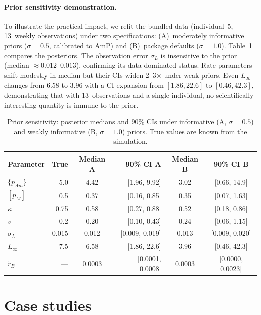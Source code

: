 \documentclass[article,shortnames]{jss}
\newcommand{\pAm}{\{p_{Am}\}}
\newcommand{\pM}{[p_M]}
\begin{document}
\paragraph{Prior sensitivity demonstration.}
To illustrate the practical impact, we refit the bundled
 data (individual~5, 13~weekly observations)
under two specifications: (A)~moderately informative priors
($\sigma = 0.5$, calibrated to AmP) and (B)~package defaults
($\sigma = 1.0$).  Table~\ref{tab:prior_sens} compares the
posteriors.  The observation error $\sigma_L$ is insensitive to
the prior (median $\approx 0.012$--$0.013$), confirming its
data-dominated status.  Rate parameters shift modestly in median
but their CIs widen 2--3$\times$ under weak priors.  Even
$L_\infty$ changes from 6.58 to 3.96 with a CI expansion from
$[1.86, 22.6]$ to $[0.46, 42.3]$, demonstrating that with
13~observations and a single individual, no scientifically
interesting quantity is immune to the prior.

\begin{table}[t!]
\centering
\caption{Prior sensitivity: posterior medians and 90\% CIs under
  informative (A, $\sigma = 0.5$) and weakly informative (B,
  $\sigma = 1.0$) priors.  True values are known from the
  simulation.}
\label{tab:prior_sens}
\begin{tabular}{lrcrcc}
\toprule
Parameter & True & Median A & 90\% CI A & Median B & 90\% CI B \\
\midrule
$\pAm$     & 5.0   & 4.42 & [1.96, 9.92] & 3.02 & [0.66, 14.9] \\
$\pM$      & 0.5   & 0.37 & [0.16, 0.85] & 0.35 & [0.07, 1.63] \\
$\kappa$   & 0.75  & 0.58 & [0.27, 0.88] & 0.52 & [0.18, 0.86] \\
$v$        & 0.2   & 0.20 & [0.10, 0.43] & 0.24 & [0.06, 1.15] \\
$\sigma_L$ & 0.015 & 0.012 & [0.009, 0.019] & 0.013 & [0.009, 0.020] \\
\midrule
$L_\infty$ & 7.5   & 6.58 & [1.86, 22.6] & 3.96 & [0.46, 42.3] \\
$\dot{r}_B$ & ---  & 0.0003 & [0.0001, 0.0008] & 0.0003 & [0.0000, 0.0023] \\
\bottomrule
\end{tabular}
\end{table}


\section{Case studies} \label{sec:casestudies}
\end{document}
